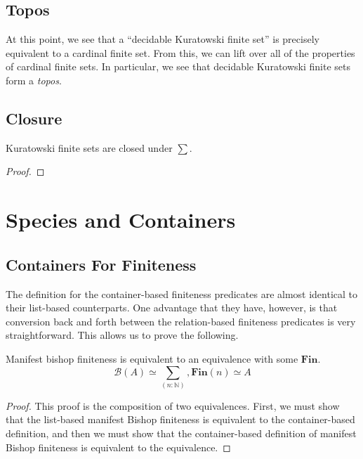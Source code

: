 \subsection{Topos}
At this point, we see that a ``decidable Kuratowski finite set'' is precisely
equivalent to a cardinal finite set.
From this, we can lift over all of the properties of cardinal finite sets.
In particular, we see that decidable Kuratowski finite sets form a \emph{topos}.
\subsection{Closure}
\begin{theorem}
  Kuratowski finite sets are closed under \(\sum\).
\end{theorem}
\begin{proof}
\end{proof}
\section{Species and Containers} \label{species-and-containers}
\subsection{Containers For Finiteness}
The definition for the container-based finiteness predicates are almost
identical to their list-based counterparts.
One advantage that they have, however, is that conversion back and forth between
the relation-based finiteness predicates is very straightforward.
This allows us to prove the following.
\begin{theorem}
  Manifest bishop finiteness is equivalent to an equivalence with some \(\mathbf{Fin}\).
  \begin{equation}
    \mathcal{B}(A) \simeq \sum_{(n : \mathbb{N})} , \mathbf{Fin}(n) \simeq A
  \end{equation}
\end{theorem}
\begin{proof}
  This proof is the composition of two equivalences.
  First, we must show that the list-based manifest Bishop finiteness is
  equivalent to the container-based definition, and then we must show that the
  container-based definition of manifest Bishop finiteness is equivalent to the
  equivalence.
\end{proof}


